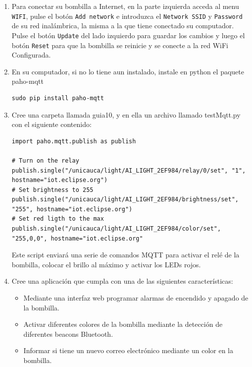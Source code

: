 \documentclass[10pt,letterpaper]{article}
\begin{document}
\begin{enumerate}
\item Para conectar su bombilla a Internet, en la parte izquierda acceda al menu \verb|WIFI|, pulse el botón \verb|Add network| e introduzca el \verb|Network SSID| y \verb|Password| de su red inalámbrica, la misma a la que tiene conectado su computador. Pulse el botón \verb|Update| del lado izquierdo para guardar los cambios y luego el botón \verb|Reset| para que la bombilla se reinicie y se conecte a la red WiFi Configurada.


\item En su computador, si no lo tiene aun instalado, instale en python el paquete paho-mqtt
\begin{verbatim}
sudo pip install paho-mqtt
\end{verbatim}

\item Cree una carpeta llamada guia10, y en ella un archivo llamado testMqtt.py con el siguiente contenido:
\begin{lstlisting}[style=myCustomPythonStyle]
import paho.mqtt.publish as publish

# Turn on the relay
publish.single("/unicauca/light/AI_LIGHT_2EF984/relay/0/set", "1", hostname="iot.eclipse.org")
# Set brightness to 255
publish.single("/unicauca/light/AI_LIGHT_2EF984/brightness/set", "255", hostname="iot.eclipse.org")
# Set red ligth to the max
publish.single("/unicauca/light/AI_LIGHT_2EF984/color/set", "255,0,0", hostname="iot.eclipse.org"
\end{lstlisting}
Este script enviará una serie de comandos MQTT para activar el relé de la bombilla, colocar el brillo al máximo y activar los LEDs rojos. 

\item Cree una aplicación que cumpla con una de las siguientes características:
\begin{itemize}
\item Mediante una interfaz web programar alarmas de encendido y apagado de la bombilla.
\item Activar diferentes colores de la bombilla mediante la detección de diferentes beacons Bluetooth. 
\item Informar si tiene un nuevo correo electrónico mediante un color en la bombilla.
\end{itemize}




\end{enumerate}
\end{document}
